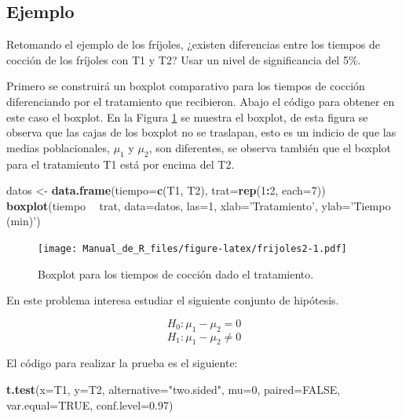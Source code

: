 \documentclass[10pt,]{krantz}
\makeatletter
\newenvironment{Shaded}{\begin{snugshade}}{\end{snugshade}}
\newcommand{\KeywordTok}[1]{\textcolor[rgb]{0.13,0.29,0.53}{\textbf{#1}}}
\newcommand{\DataTypeTok}[1]{\textcolor[rgb]{0.13,0.29,0.53}{#1}}
\newcommand{\DecValTok}[1]{\textcolor[rgb]{0.00,0.00,0.81}{#1}}
\newcommand{\FloatTok}[1]{\textcolor[rgb]{0.00,0.00,0.81}{#1}}
\newcommand{\StringTok}[1]{\textcolor[rgb]{0.31,0.60,0.02}{#1}}
\newcommand{\OtherTok}[1]{\textcolor[rgb]{0.56,0.35,0.01}{#1}}
\newcommand{\OperatorTok}[1]{\textcolor[rgb]{0.81,0.36,0.00}{\textbf{#1}}}
\newcommand{\NormalTok}[1]{#1}
\newenvironment{kframe}{%
\medskip{}
\setlength{\fboxsep}{.8em}
 \def\at@end@of@kframe{}%
 \ifinner\ifhmode%
  \def\at@end@of@kframe{\end{minipage}}%
  \begin{minipage}{\columnwidth}%
 \fi\fi%
 \def\FrameCommand##1{\hskip\@totalleftmargin \hskip-\fboxsep
 \colorbox{shadecolor}{##1}\hskip-\fboxsep
     \hskip-\linewidth \hskip-\@totalleftmargin \hskip\columnwidth}%
 \MakeFramed {\advance\hsize-\width
   \@totalleftmargin\z@ \linewidth\hsize
   \@setminipage}}%
 {\par\unskip\endMakeFramed%
 \at@end@of@kframe}
\renewenvironment{Shaded}{\begin{kframe}}{\end{kframe}}
\makeatother
\begin{document}
\subsection*{Ejemplo}\label{ejemplo-70}


Retomando el ejemplo de los fríjoles, ¿existen diferencias entre los
tiempos de cocción de los fríjoles con T1 y T2? Usar un nivel de
significancia del 5\%.

Primero se construirá un boxplot comparativo para los tiempos de cocción
diferenciando por el tratamiento que recibieron. Abajo el código para
obtener en este caso el boxplot. En la Figura \ref{fig:frijoles2} se
muestra el boxplot, de esta figura se observa que las cajas de los
boxplot no se traslapan, esto es un indicio de que las medias
poblacionales, \(\mu_1\) y \(\mu_2\), son diferentes, se observa también
que el boxplot para el tratamiento T1 está por encima del T2.

\begin{Shaded}
\begin{Highlighting}[]
\NormalTok{datos <-}\StringTok{ }\KeywordTok{data.frame}\NormalTok{(}\DataTypeTok{tiempo=}\KeywordTok{c}\NormalTok{(T1, T2), }\DataTypeTok{trat=}\KeywordTok{rep}\NormalTok{(}\DecValTok{1}\OperatorTok{:}\DecValTok{2}\NormalTok{, }\DataTypeTok{each=}\DecValTok{7}\NormalTok{))}
\KeywordTok{boxplot}\NormalTok{(tiempo }\OperatorTok{~}\StringTok{ }\NormalTok{trat, }\DataTypeTok{data=}\NormalTok{datos, }\DataTypeTok{las=}\DecValTok{1}\NormalTok{,}
        \DataTypeTok{xlab=}\StringTok{'Tratamiento'}\NormalTok{, }\DataTypeTok{ylab=}\StringTok{'Tiempo (min)'}\NormalTok{)}
\end{Highlighting}
\end{Shaded}

\begin{figure}
\centering
\texttt{[image: Manual\_de\_R\_files/figure-latex/frijoles2-1.pdf]}
\caption{\label{fig:frijoles2}Boxplot para los tiempos de cocción dado el
tratamiento.}
\end{figure}

En este problema interesa estudiar el siguiente conjunto de hipótesis.

\[H_0: \mu_1  - \mu_2 = 0\] \[H_1: \mu_1  - \mu_2 \neq 0\]

El código para realizar la prueba es el siguiente:

\begin{Shaded}
\begin{Highlighting}[]
\KeywordTok{t.test}\NormalTok{(}\DataTypeTok{x=}\NormalTok{T1, }\DataTypeTok{y=}\NormalTok{T2, }\DataTypeTok{alternative=}\StringTok{"two.sided"}\NormalTok{, }\DataTypeTok{mu=}\DecValTok{0}\NormalTok{, }
       \DataTypeTok{paired=}\OtherTok{FALSE}\NormalTok{, }\DataTypeTok{var.equal=}\OtherTok{TRUE}\NormalTok{, }\DataTypeTok{conf.level=}\FloatTok{0.97}\NormalTok{)}
\end{Highlighting}
\end{Shaded}
\end{document}
